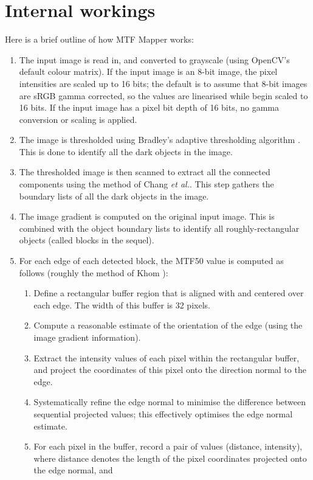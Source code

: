 \documentclass[a4paper]{article}
\begin{document}
\section{Internal workings}
Here is a brief outline of how MTF Mapper works:
\begin{enumerate}
    \item The input image is read in, and converted to grayscale (using
OpenCV's default colour matrix). If the input image is an 8-bit image, the
pixel intensities are scaled up to 16 bits; the default is to assume that
8-bit images are sRGB gamma corrected, so the values are linearised while
begin scaled to 16 bits. If the input image has a pixel bit depth of 16
bits, no gamma conversion or scaling is applied.
    \item The image is thresholded using Bradley's adaptive thresholding 
algorithm \cite{bradley}. This is done to identify all the dark objects in
the image.
    \item The thresholded image is then scanned to extract all the connected
components using the method of Chang \textit{et al.}\cite{chang}. This step
gathers the boundary lists of all the dark objects in the image.
    \item The image gradient is computed on the original input image. This
is combined with the object boundary lists to identify all
roughly-rectangular objects (called blocks in the sequel).
    \item For each edge of each detected block, the MTF50 value is computed
as follows (roughly the method of Khom \cite{khom}):
	\begin{enumerate}
	  \item Define a rectangular buffer region that is aligned with and
centered over each edge. The width of this buffer is 32 pixels.
	  \item Compute a reasonable estimate of the orientation of the edge
(using the image gradient information).
	  \item Extract the intensity values of each pixel within the
rectangular buffer, and project the coordinates of this pixel onto the
direction normal to the edge.
          \item Systematically refine the edge normal to minimise the
difference between sequential projected values; this effectively optimises
the edge normal estimate.
	  \item For each pixel in the buffer, record a pair of values
(\textsf{distance}, \textsf{intensity}), where \textsf{distance} denotes the
length of the pixel coordinates projected onto the edge normal, and

\end{enumerate}
\end{enumerate}
\end{document}
